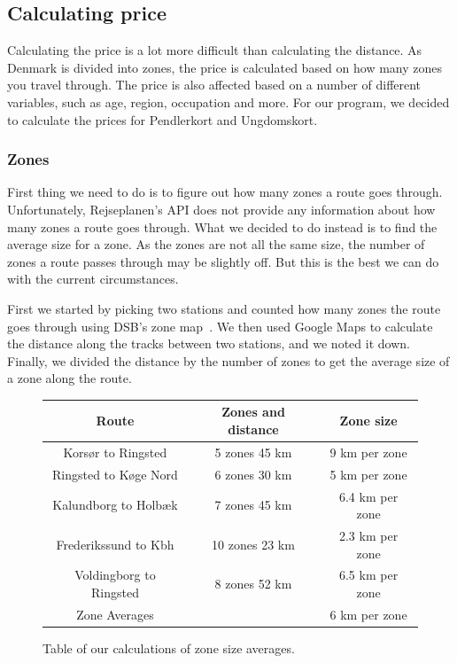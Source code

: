 
\subsection{Calculating price}\label{subsec:calculating-price}

Calculating the price is a lot more difficult than calculating the distance.
As Denmark is divided into zones, the price is calculated based on how many zones you travel through.
The price is also affected based on a number of different variables, such as age, region, occupation and more.
For our program, we decided to calculate the prices for Pendlerkort and Ungdomskort.

\subsubsection{Zones}

First thing we need to do is to figure out how many zones a route goes through.
Unfortunately, Rejseplanen's API does not provide any information about how many zones a route goes through.
What we decided to do instead is to find the average size for a zone.
As the zones are not all the same size, the number of zones a route passes through may be slightly off.
But this is the best we can do with the current circumstances.

First we started by picking two stations and counted how many zones the route goes through using DSB's zone
map~\cite{price_zones}.
We then used Google Maps to calculate the distance along the tracks between two stations, and we noted it down.
Finally, we divided the distance by the number of zones to get the average size of a zone along the route.

\begin{figure}[H]
    \centering
    \noindent
    \begin{tabular}{ || c | c | c || }
        \hline
        Route & Zones and distance & Zone size \\
        \hline\hline
        Korsør to Ringsted & 5 zones 45 km & 9 km per zone \\
        \hline
        Ringsted to Køge Nord & 6 zones 30 km & 5 km per zone \\
        \hline
        Kalundborg to Holbæk & 7 zones 45 km & 6.4 km per zone \\
        \hline
        Frederikssund to Kbh & 10 zones 23 km & 2.3 km per zone \\
        \hline
        Voldingborg to Ringsted & 8 zones 52 km & 6.5 km per zone \\
        \hline\hline
        Zone Averages & & 6 km per zone \\
        \hline
    \end{tabular}
    \caption{Table of our calculations of zone size averages.}
    \label{fig:table-zone-size-averages}
\end{figure}

